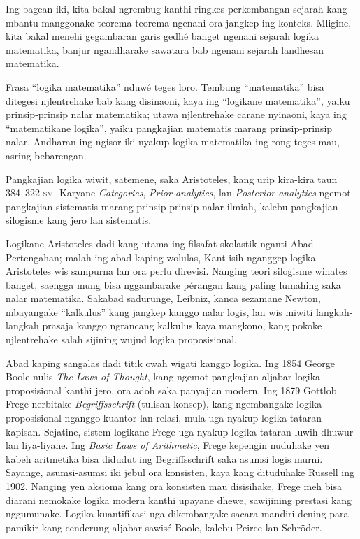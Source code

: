 \documentclass[../../../include/open-logic-section]{subfiles}
\begin{document}


Ing bagean iki, kita bakal ngrembug kanthi ringkes
perkembangan sejarah kang mbantu manggonake
teorema-teorema ngenani ora jangkep ing konteks.
Mligine, kita bakal menehi gegambaran garis gedhé
banget ngenani sejarah logika matematika, banjur
ngandharake sawatara bab ngenani sejarah
landhesan matematika.

\begin{digress}
  Frasa ``logika matematika'' nduwé teges loro.
  Tembung ``matematika'' bisa ditegesi njlentrehake
  bab kang disinaoni, kaya ing ``logikane matematika'',
  yaiku prinsip-prinsip nalar matematika; utawa
  njlentrehake carane nyinaoni, kaya ing
  ``matematikane logika'', yaiku pangkajian matematis
  marang prinsip-prinsip nalar. Andharan ing ngisor
  iki nyakup logika matematika ing rong teges mau,
  asring bebarengan.
\end{digress}

Pangkajian logika wiwit, satemene, saka Aristoteles,
kang urip kira-kira taun 384--322 \textsc{sm}.
Karyane \emph{Categories}, \emph{Prior
  analytics}, lan \emph{Posterior analytics} ngemot
pangkajian sistematis marang prinsip-prinsip nalar
ilmiah, kalebu pangkajian silogisme kang jero lan
sistematis.

Logikane Aristoteles dadi kang utama ing filsafat
skolastik nganti Abad Pertengahan; malah ing abad
kaping wolulas, Kant isih nganggep logika Aristoteles
wis sampurna lan ora perlu direvisi. Nanging teori
silogisme winates banget, saengga mung bisa
nggambarake pérangan kang paling lumahing saka
nalar matematika. Sakabad sadurunge, Leibniz,
kanca sezamane Newton, mbayangake ``kalkulus''
kang jangkep kanggo nalar logis, lan wis miwiti
langkah-langkah prasaja kanggo ngrancang kalkulus
kaya mangkono, kang pokoke njlentrehake salah
sijining wujud logika proposisional.

Abad kaping sangalas dadi titik owah wigati kanggo
logika. Ing 1854 George Boole nulis \emph{The Laws of
  Thought}, kang ngemot pangkajian aljabar logika
proposisional kanthi jero, ora adoh saka panyajian
modern. Ing 1879 Gottlob Frege nerbitake
\emph{Begriffsschrift} (tulisan konsep), kang
ngembangake logika proposisional nganggo kuantor
lan relasi, mula uga nyakup logika tataran kapisan.
Sejatine, sistem logikane Frege uga nyakup logika
tataran luwih dhuwur lan liya-liyane. Ing \emph{Basic Laws
  of Arithmetic}, Frege kepengin nuduhake yen
kabeh aritmetika bisa didudut ing Begriffsschrift
saka asumsi logis murni. Sayange, asumsi-asumsi
iki jebul ora konsisten, kaya kang dituduhake
Russell ing 1902. Nanging yen aksioma kang ora
konsisten mau disisihake, Frege meh bisa diarani
nemokake logika modern kanthi upayane dhewe,
sawijining prestasi kang nggumunake. Logika
kuantifikasi uga dikembangake sacara mandiri
dening para pamikir kang cenderung aljabar sawisé
Boole, kalebu Peirce lan Schr\"oder.
\end{document}
